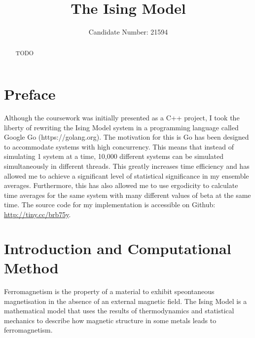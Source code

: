 \documentclass[11pt]{iopart}
\begin{document}
\setlength{\marginparwidth}{1.5cm}

\title[]{The Ising Model}

\author{Candidate Number: 21594}

\address{Department of Physics,
University of Bath, Bath BA2 7AY, United Kingdom}
\begin{abstract}
TODO
\end{abstract}



\section*{Preface}
Although the coursework was initially presented as a C++ project, I took the liberty of rewriting the Ising Model system in a programming language called Google Go (https://golang.org). The motivation for this is Go has been designed to accommodate systems with high concurrency. This means that instead of simulating 1 system at a time, 10,000 different systems can be simulated simultaneously in different threads. This greatly increases time efficiency and has allowed me to achieve a significant level of statistical significance in my ensemble averages. Furthermore, this has also allowed me to use ergodicity to calculate time averages for the same system with many different values of beta at the same time. The source code for my implementation is accessible on Github: \url{http://tiny.cc/brb75y}.

\section{Introduction and Computational Method}
Ferromagnetism is the property of a material to exhibit speontaneous magnetisation in the absence of an external magnetic field. The Ising Model is a mathematical model that uses the results of thermodynamics and statistical mechanics to describe how magnetic structure in some metals leads to ferromagnetism.
\end{document}
